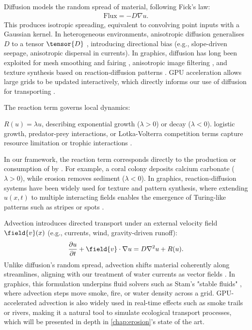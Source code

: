 Diffusion models the random spread of material, following Fick's law:
\begin{align}
    \text{Flux} = -D \nabla u.
\end{align}
This produces isotropic spreading, equivalent to convolving point inputs with a Gaussian kernel. In heterogeneous environments, anisotropic diffusion generalises $D$ to a tensor $\tensor{D}$ \cite{Ramos2024}, introducing directional bias (e.g., slope-driven seepage, anisotropic dispersal in currents).  
In graphics, diffusion has long been exploited for mesh smoothing and fairing \cite{Taubin1995}, anisotropic image filtering \cite{Perona1990}, and texture synthesis based on reaction-diffusion patterns \cite{Turk1991}. GPU acceleration allows large grids to be updated interactively, which directly informs our use of diffusion for transporting .

The reaction term governs local dynamics:
\begin{Itemize}
     $R(u) = \lambda u$, describing exponential growth ($\lambda > 0$) or decay ($\lambda < 0$).
     logistic growth, predator-prey interactions, or Lotka-Volterra competition terms capture resource limitation or trophic interactions \cite{Brauer2012,Verhulst1844}.
\end{Itemize}
In our framework, the reaction term corresponds directly to the production or consumption of  by . For example, a coral colony deposits calcium carbonate ($\lambda > 0$), while erosion removes sediment ($\lambda < 0$).  
In graphics, reaction-diffusion systems have been widely used for texture and pattern synthesis, where extending $u(x,t)$ to multiple interacting fields enables the emergence of Turing-like patterns such as stripes or spots \cite{Turk1991, Witkin1991,Sanderson2006}.

Advection introduces directed transport under an external velocity field $\field{v}(x)$ (e.g., currents, wind, gravity-driven runoff):
\begin{align}
    \label{eq:reaction-diffusion-advection}
    \frac{\partial u}{\partial t} + \field{v}\cdot \nabla u = D \nabla^2 u + R(u).
\end{align}
Unlike diffusion's random spread, advection shifts material coherently along streamlines, aligning with our treatment of water currents as vector fields \cite{Burger2020,Ogden2017}.  
In graphics, this formulation underpins fluid solvers such as Stam's "stable fluids" \cite{Stam1999}, where advection steps move smoke, fire, or water density across a grid. GPU-accelerated advection is also widely used in real-time effects such as smoke trails or rivers, making it a natural tool to simulate ecological transport processes, which will be presented in depth in \cref{chap:erosion}'s state of the art.

